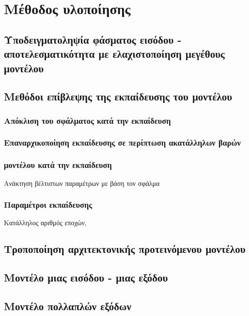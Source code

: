 \chapter{Μέθοδος υλοποίησης}
\label{ch:implementation_method}

\section{Υποδειγματοληψία φάσματος εισόδου - αποτελεσματικότητα με ελαχιστοποίηση μεγέθους μοντέλου}

\section{Μεθόδοι επίβλεψης της εκπαίδευσης του μοντέλου}

\subsection{Απόκλιση του σφάλματος  κατά την εκπαίδευση}

\subsection{Επαναρχικοποίηση εκπαίδευσης σε περίπτωση ακατάλληλων βαρών}

\subsection{ μοντέλου κατά την εκπαίδευση}
Ανάκτηση βέλτιστων παραμέτρων με βάση τον σφάλμα 

\subsection{Παραμέτροι εκπαίδευσης}
Κατάλληλος αριθμός εποχών, 

\section{Τροποποίηση αρχιτεκτονικής προτεινόμενου μοντέλου}

\section{Μοντέλο μιας εισόδου - μιας εξόδου}

\section{Μοντέλο πολλαπλών εξόδων}

